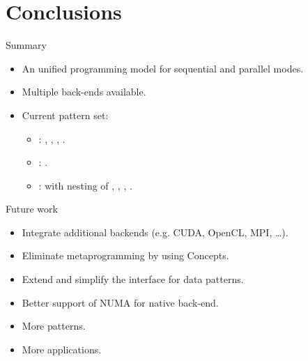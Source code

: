 \section{Conclusions}

\begin{frame}[t]{Summary}
\begin{itemize}
  \item An unified programming model for sequential and parallel modes.
  \vfill
  \item Multiple back-ends available.
  \vfill
  \item Current pattern set:
    \begin{itemize}
      \item {}: , , , .
      \item {}: .
      \item {}:  with nesting of , ,
            , .
    \end{itemize}
\end{itemize}
\end{frame}

\begin{frame}[t]{Future work}
\begin{itemize}
  \item Integrate additional backends (e.g. CUDA, OpenCL, MPI, \ldots).
  \item Eliminate metaprogramming by using Concepts.
  \item Extend and simplify the interface for data patterns.
  \item Better support of NUMA for native back-end. 
  \item More patterns.
  \item More applications.
\end{itemize}
\end{frame}

